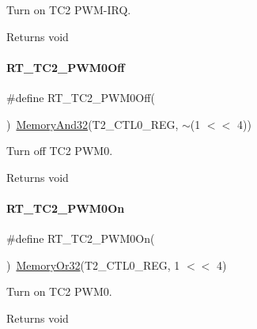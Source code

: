 Turn on T\+C2 P\+W\+M-\/\+I\+RQ. 

\begin{DoxyReturn}{Returns}
void 
\end{DoxyReturn}
\mbox{\label{a00047_a52f984fc9f5bc4d1821025ad8d75f3c9}} 
\paragraph{\texorpdfstring{R\+T\+\_\+\+T\+C2\+\_\+\+P\+W\+M0\+Off}{RT\_TC2\_PWM0Off}}
{\footnotesize\ttfamily \#define R\+T\+\_\+\+T\+C2\+\_\+\+P\+W\+M0\+Off(\begin{DoxyParamCaption}{ }\end{DoxyParamCaption})~\mbox{\hyperlink{a00020_a5c1a2bd4c1bd4c2f429d8042a45327ff}{Memory\+And32}}(T2\+\_\+\+C\+T\+L0\+\_\+\+R\+EG, $\sim$(1 $<$$<$ 4))}



Turn off T\+C2 P\+W\+M0. 

\begin{DoxyReturn}{Returns}
void 
\end{DoxyReturn}
\mbox{\label{a00047_abaff3048e72dc0cb912c898a0a4c4e14}} 
\paragraph{\texorpdfstring{R\+T\+\_\+\+T\+C2\+\_\+\+P\+W\+M0\+On}{RT\_TC2\_PWM0On}}
{\footnotesize\ttfamily \#define R\+T\+\_\+\+T\+C2\+\_\+\+P\+W\+M0\+On(\begin{DoxyParamCaption}{ }\end{DoxyParamCaption})~\mbox{\hyperlink{a00020_a9ea92ebccdef6bdaca4d00210cc7266d}{Memory\+Or32}}(T2\+\_\+\+C\+T\+L0\+\_\+\+R\+EG, 1 $<$$<$ 4)}



Turn on T\+C2 P\+W\+M0. 

\begin{DoxyReturn}{Returns}
void 
\end{DoxyReturn}
\mbox{\label{a00047_adec1566e2c2a16ab922163a22f3c99df}} 

